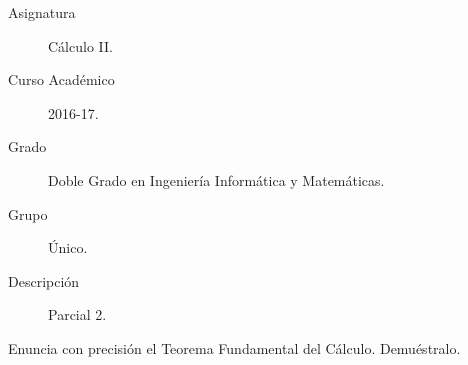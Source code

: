 \documentclass[12pt]{article}
\begin{document}

    
    

    \begin{description}
        \item[Asignatura] Cálculo II.
        \item[Curso Académico] 2016-17.
        \item[Grado] Doble Grado en Ingeniería Informática y Matemáticas.
        \item[Grupo] Único.
        \item[Descripción] Parcial 2.
    
    \end{description}
    \newpage
    
    \begin{ejercicio} 
Enuncia con precisión el Teorema Fundamental del Cálculo. Demuéstralo.
    
\end{ejercicio}
\end{document}
